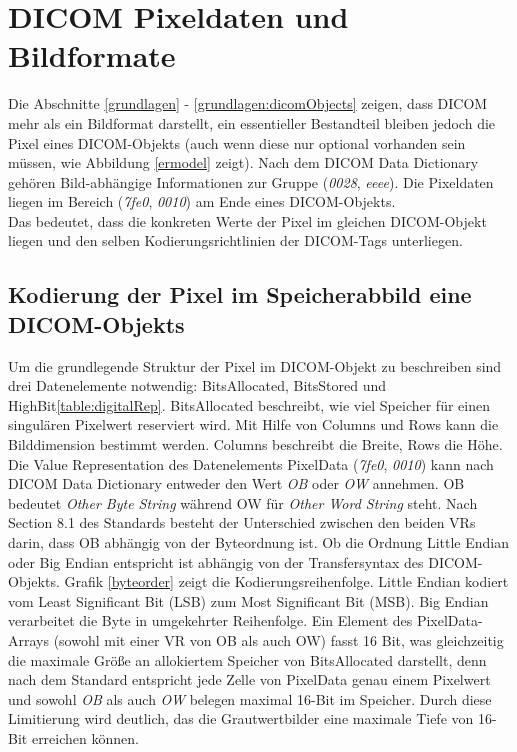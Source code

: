 \section{DICOM Pixeldaten und Bildformate}

Die Abschnitte \ref{grundlagen} - \ref{grundlagen:dicomObjects} zeigen, dass DICOM mehr als ein Bildformat darstellt, ein essentieller Bestandteil bleiben jedoch die Pixel eines DICOM-Objekts (auch wenn diese nur optional vorhanden sein müssen, wie Abbildung \ref{ermodel} zeigt). Nach dem DICOM Data Dictionary gehören Bild-abhängige Informationen zur Gruppe (\textit{0028}, \textit{eeee}).
Die Pixeldaten liegen im Bereich (\textit{7fe0}, \textit{0010}) am Ende eines DICOM-Objekts.\\
Das bedeutet, dass die konkreten Werte der Pixel im gleichen DICOM-Objekt liegen und den selben Kodierungsrichtlinien der DICOM-Tags unterliegen.

\subsection{Kodierung der Pixel im Speicherabbild eine DICOM-Objekts} \label{pixelkodierung}

Um die grundlegende Struktur der Pixel im DICOM-Objekt zu beschreiben sind drei Datenelemente notwendig: BitsAllocated, BitsStored und HighBit\ref{table:digitalRep}. BitsAllocated beschreibt, wie viel Speicher für einen singulären Pixelwert reserviert wird. Mit Hilfe von Columns und Rows kann die Bilddimension bestimmt werden. Columns beschreibt die Breite, Rows die Höhe. Die Value Representation des Datenelements PixelData (\textit{7fe0}, \textit{0010}) kann nach DICOM Data Dictionary entweder den Wert \textit{OB} oder \textit{OW} annehmen. OB bedeutet \textit{Other Byte String} während OW für \textit{Other Word String} steht. Nach Section 8.1 des Standards\cite{dicom:structure} besteht der Unterschied zwischen den beiden VRs darin, dass OB abhängig von der Byteordnung ist. Ob die Ordnung Little Endian oder Big Endian entspricht ist abhängig von der Transfersyntax des DICOM-Objekts.
Grafik \ref{byteorder} zeigt die Kodierungsreihenfolge. Little Endian kodiert vom Least Significant Bit (LSB) zum Most Significant Bit (MSB). Big Endian verarbeitet die Byte in umgekehrter Reihenfolge. Ein Element des PixelData-Arrays (sowohl mit einer VR von OB als auch OW) fasst 16 Bit, was gleichzeitig die maximale Größe an allokiertem Speicher von BitsAllocated darstellt, denn nach dem Standard entspricht jede Zelle von PixelData genau einem Pixelwert \cite[8.1.1]{dicom:structure} und sowohl \textit{OB} als auch \textit{OW} belegen maximal 16-Bit im Speicher. Durch diese Limitierung wird deutlich, das die Grautwertbilder eine maximale Tiefe von 16-Bit erreichen können.

